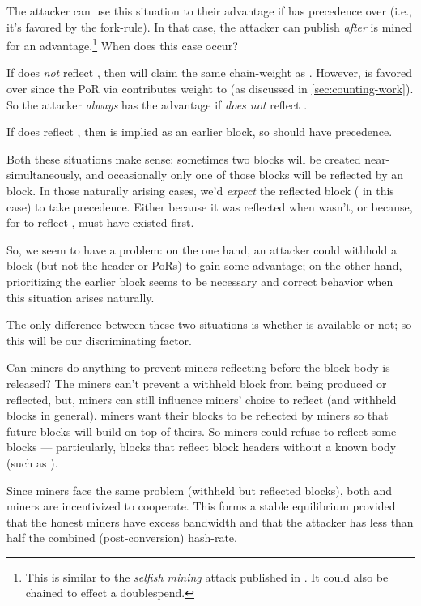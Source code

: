 The attacker can use this situation to their advantage if  has precedence over  (i.e., it's favored by the fork-rule).
In that case, the attacker can publish  \emph{after}  is mined for an advantage.\footnote{
    This is similar to the \emph{selfish mining} attack published in \citeSelfishMiningFull{}.
    It could also be chained to effect a doublespend.
}
When does this case occur?

If  does \emph{not} reflect , then  will claim the same chain-weight as .
However,  is favored over  since the PoR via  contributes weight to  (as discussed in \autoref{sec:counting-work}).
So the attacker \emph{always} has the advantage if  \emph{does not} reflect .

If  does reflect , then  is implied as an earlier block, so should have precedence.

Both these situations make sense: sometimes two \cR blocks will be created near-simultaneously, and occasionally only one of those blocks will be reflected by an \cL block.
In those naturally arising cases, we'd \emph{expect} the reflected block ( in this case) to take precedence.
Either because it was reflected when  wasn't, or because, for  to reflect ,  must have existed first.

So, we seem to have a problem: on the one hand, an attacker could withhold a block (but not the header or PoRs) to gain some advantage; on the other hand, prioritizing the earlier block seems to be necessary and correct behavior when this situation arises naturally.

The only difference between these two situations is whether  is available or not; so this will be our discriminating factor.

Can \cR miners do anything to prevent \cL miners reflecting  before the block body is released?
The \cR miners can't prevent a withheld \cR block from being produced or reflected, but, \cR miners can still influence \cL miners' choice to reflect  (and withheld blocks in general).
\cL miners want their blocks to be reflected by \cR miners so that future \cL blocks will build on top of theirs.
So \cR miners could refuse to reflect some \cL blocks --- particularly, \cL blocks that reflect \cR block headers without a known body (such as ).

Since \cL miners face the same problem (withheld but reflected \cL blocks), both \cL and \cR miners are incentivized to cooperate.
This forms a stable equilibrium provided that the honest miners have excess bandwidth and that the attacker has less than half the combined (post-conversion) hash-rate.

